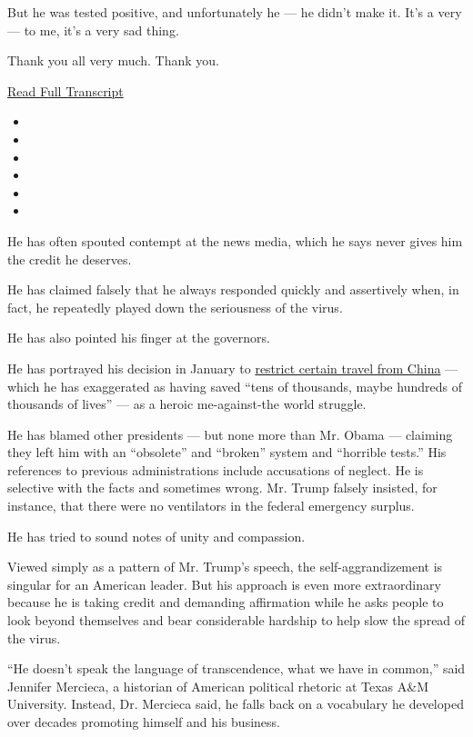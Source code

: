 But he was tested positive, and unfortunately he --- he didn't make it.
It's a very --- to me, it's a very sad thing.

Thank you all very much. Thank you.

\href{https://www.whitehouse.gov/briefings-statements/remarks-president-trump-vice-president-pence-members-coronavirus-task-force-press-briefing-25/}{Read
Full Transcript}

\begin{itemize}
\item
\item
\item
\item
\item
\item
\end{itemize}

He has often spouted contempt at the news media, which he says never
gives him the credit he deserves.

He has claimed falsely that he always responded quickly and assertively
when, in fact, he repeatedly played down the seriousness of the virus.

He has also pointed his finger at the governors.

He has portrayed his decision in January to
\href{https://www.nytimes.com/2020/04/04/us/coronavirus-china-travel-restrictions.html}{restrict
certain travel from China} --- which he has exaggerated as having saved
``tens of thousands, maybe hundreds of thousands of lives'' --- as a
heroic me-against-the world struggle.

He has blamed other presidents --- but none more than Mr. Obama ---
claiming they left him with an ``obsolete'' and ``broken'' system and
``horrible tests.'' His references to previous administrations include
accusations of neglect. He is selective with the facts and sometimes
wrong. Mr. Trump falsely insisted, for instance, that there were no
ventilators in the federal emergency surplus.

He has tried to sound notes of unity and compassion.

Viewed simply as a pattern of Mr. Trump's speech, the
self-aggrandizement is singular for an American leader. But his approach
is even more extraordinary because he is taking credit and demanding
affirmation while he asks people to look beyond themselves and bear
considerable hardship to help slow the spread of the virus.

``He doesn't speak the language of transcendence, what we have in
common,'' said Jennifer Mercieca, a historian of American political
rhetoric at Texas A\&M University. Instead, Dr. Mercieca said, he falls
back on a vocabulary he developed over decades promoting himself and his
business.

